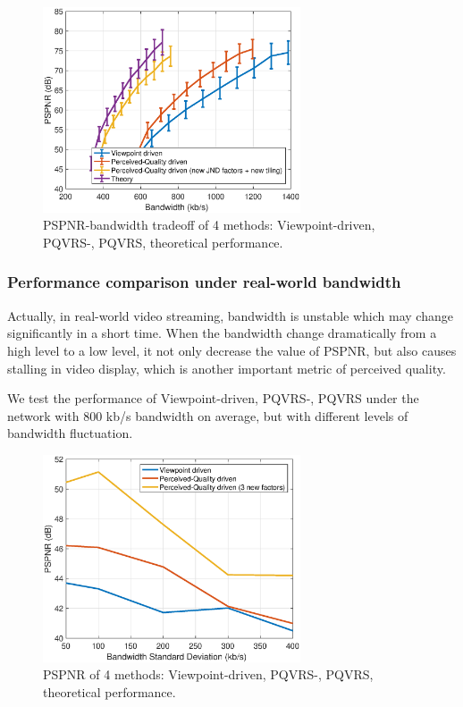   \begin{figure}
  \centering
  \includegraphics[width=3in]{images/practical_improvement.eps}
  \caption{PSPNR-bandwidth tradeoff of 4 methods: Viewpoint-driven, PQVRS-, PQVRS, theoretical performance.}
  \label{practical_imp}
  \end{figure}

\subsubsection{Performance comparison under real-world bandwidth}

Actually, in real-world video streaming, bandwidth is unstable which may change significantly in a short time. When the bandwidth change dramatically from a high level to a low level, it not only decrease the value of PSPNR, but also causes stalling in video display, which is another important metric of perceived quality.

We test the performance of Viewpoint-driven, PQVRS-, PQVRS under the network with 800 kb/s bandwidth on average, but with different levels of bandwidth fluctuation. 

   \begin{figure}
  \centering
  \includegraphics[width=3in]{images/throughput-PSPNR.eps}
  \caption{PSPNR of 4 methods: Viewpoint-driven, PQVRS-, PQVRS, theoretical performance.}
  \label{practical_PSPNR}
  \end{figure}
  
